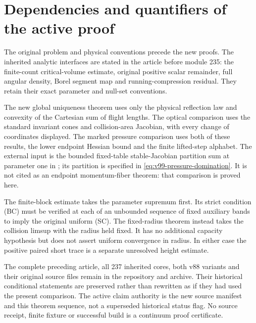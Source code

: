 \section{Dependencies and quantifiers of the active proof}
\label{app:v99-dependencies}
The original problem and physical conventions precede the new proofs.
The inherited analytic interfaces are stated in the article before
module 235: the finite-count critical-volume estimate, original
positive scalar remainder, full angular density, Borel segment map
and running-compression residual. They retain their exact parameter
and null-set conventions.

The new global uniqueness theorem uses only the physical reflection
law and convexity of the Cartesian sum of flight lengths. The optical
comparison uses the standard invariant cones and collision-area
Jacobian, with every change of coordinates displayed. The marked
pressure comparison uses both of these results, the lower endpoint
Hessian bound and the finite lifted-step alphabet. The external input
is the bounded fixed-table stable-Jacobian partition sum at parameter
one in \cite[Lemma 3.8, proof]{BDPressure}; its partition is specified
in \eqref{eq:v99-pressure-domination}. It is not cited as an endpoint
momentum-fiber theorem: that comparison is proved here.

The finite-block estimate takes the parameter supremum first. Its
strict condition (BC) must be verified at each of an unbounded sequence
of fixed auxiliary bands to imply the original uniform (SC). The
fixed-radius theorem instead takes the collision limsup with the
radius held fixed. It has no additional capacity hypothesis but does
not assert uniform convergence in radius. In either case the positive
paired short trace is a separate unresolved height estimate.

The complete preceding article, all 237 inherited cores, both v88
variants and their original source files remain in the repository and
archive. Their historical conditional statements are preserved rather
than rewritten as if they had used the present comparison. The active
claim authority is the new source manifest and this theorem sequence,
not a superseded historical status flag. No source receipt, finite
fixture or successful build is a continuum proof certificate.
